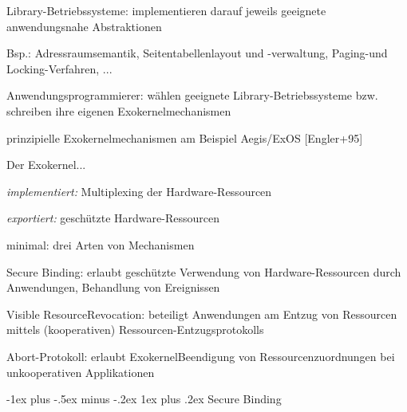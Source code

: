 \documentclass[a4paper]{article}
\makeatletter
\renewcommand{\subsubsection}{\@startsection{subsubsection}{3}{0mm}%
 {-1ex plus -.5ex minus -.2ex}%
 {1ex plus .2ex}%
 {\normalfont\small\bfseries}}
\makeatother
\begin{document}
\begin{multicols}{3}
\begin{itemize*}
\begin{itemize*}
            \item Library-Betriebssysteme: implementieren darauf jeweils geeignete anwendungsnahe Abstraktionen \begin{itemize*} \item Bsp.: Adressraumsemantik, Seitentabellenlayout und -verwaltung, Paging-und Locking-Verfahren, ... \end{itemize*}
            \item Anwendungsprogrammierer: wählen geeignete Library-Betriebssysteme bzw. schreiben ihre eigenen Exokernelmechanismen
        \end{itemize*}
        \item
        prinzipielle Exokernelmechanismen am Beispiel Aegis/ExOS
        [Engler+95]
        \begin{itemize*}
            \item Der Exokernel... \begin{itemize*} \item \emph{implementiert:} Multiplexing der Hardware-Ressourcen \item \emph{exportiert:} geschützte Hardware-Ressourcen \end{itemize*}
        \end{itemize*}
        \item
        minimal: drei Arten von Mechanismen
        \begin{enumerate*}

            \item Secure Binding: erlaubt geschützte Verwendung von Hardware-Ressourcen durch Anwendungen, Behandlung von Ereignissen
            \item Visible ResourceRevocation: beteiligt Anwendungen am Entzug von Ressourcen mittels (kooperativen) Ressourcen-Entzugsprotokolls
            \item Abort-Protokoll: erlaubt ExokernelBeendigung von Ressourcenzuordnungen bei unkooperativen Applikationen
        \end{enumerate*}
    \end{itemize*}


    \subsubsection{Secure Binding}


\end{multicols}
\end{document}
